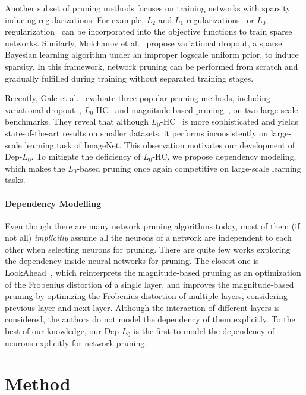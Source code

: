 \documentclass[runningheads, envcountsame, a4paper]{llncs}
\begin{document}
Another subset of pruning methods focuses on training networks with sparsity inducing regularizations. For example, $L_2$ and $L_1$ regularizations~\cite{liu2015sparse,wen2016ssl} or $L_0$ regularization~\cite{louizos2017learning} can be incorporated into the objective functions to train sparse networks. Similarly, Molchanov et al.~\cite{molchanov2017variational} propose variational dropout, a sparse Bayesian learning algorithm under an improper logscale uniform prior, to induce sparsity. In this framework, network pruning can be performed from scratch and gradually fulfilled during training without separated training stages.

Recently, Gale et al.~\cite{gale2019state} evaluate three popular pruning methods, including variational dropout~\cite{molchanov2017variational}, $L_0$-HC~\cite{louizos2017learning} and magnitude-based pruning~\cite{zhu2017prune}, on two large-scale benchmarks. They reveal that although $L_0$-HC~\cite{louizos2017learning} is more sophisticated and yields state-of-the-art results on smaller datasets, it performs inconsistently on large-scale learning task of ImageNet. This observation motivates our development of Dep-$L_0$. To mitigate the deficiency of $L_0$-HC, we propose dependency modeling, which makes the $L_0$-based pruning once again competitive on large-scale learning tasks.

\paragraph{\textbf{Dependency Modelling}}
Even though there are many network pruning algorithms today, most of them (if not all) \emph{implicitly} assume all the neurons of a network are independent to each other when selecting neurons for pruning. There are quite few works exploring the dependency inside neural networks for pruning. The closest one is LookAhead~\cite{park2020lookahead}, which reinterprets the magnitude-based pruning as an optimization of the Frobenius distortion of a single layer, and improves the magnitude-based pruning by optimizing the Frobenius distortion of multiple layers, considering previous layer and next layer. Although the interaction of different layers is considered, the authors do not model the dependency of them explicitly. To the best of our knowledge, our Dep-$L_0$ is the first to model the dependency of neurons explicitly for network pruning.

\section{Method}
\end{document}
